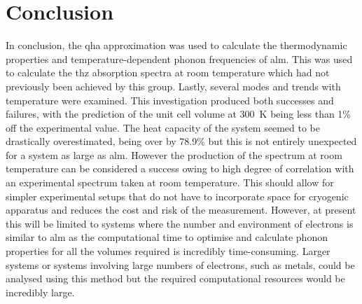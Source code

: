 \section{Conclusion}
In conclusion, the \acrshort{qha} approximation was used to calculate the thermodynamic properties and temperature\nobreakdash-dependent phonon frequencies of \acrshort{alm}. This was used to calculate the \acrshort{thz} absorption spectra at room temperature which had not previously been achieved by this group. Lastly, several modes and \DIFdelbegin {}\DIFdelend \DIFaddbegin {}\DIFaddend trends with temperature were examined. This investigation produced both successes and failures, with the prediction of the unit cell volume at \SI{300}{K} being less than 1\% off the experimental value. The heat capacity of the system seemed to be drastically overestimated, being over by 78.9\% but this is not entirely unexpected for a system as large as \acrshort{alm}. However the production of the spectrum at room temperature can be considered a success owing to high degree of correlation with an experimental spectrum taken at room temperature. This should allow for simpler experimental setups that do not have to incorporate space for cryogenic apparatus and reduces the cost and risk of the measurement. However, at present this will be limited to systems where the number and environment of electrons is similar to \acrshort{alm} as the computational time to optimise and calculate phonon properties for all the volumes required is incredibly time\nobreakdash-consuming. Larger systems or systems involving large numbers of electrons, such as metals, could be analysed using this method but the required computational resources would be incredibly large. 
